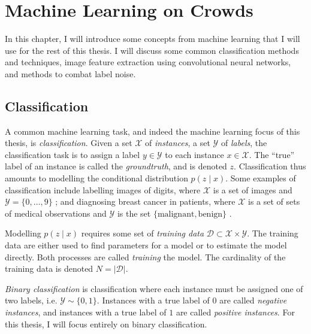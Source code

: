 \chapter{Machine Learning on Crowds}
\label{cha:ml}

 In this chapter, I will introduce some
concepts from machine learning that I will use for the rest of this thesis. I
will discuss some common classification methods and techniques, image feature
extraction using convolutional neural networks, and methods to combat label noise.

\section{Classification}
\label{sec:classification}
    
    A common machine learning task, and indeed the machine learning focus of
    this thesis, is \emph{classification}. Given a set $\mathcal X$ of
    \emph{instances}, a set $\mathcal Y$ of \emph{labels}, the classification
    task is to assign a label $y \in \mathcal Y$ to each instance $x \in
    \mathcal X$. The ``true'' label of an instance is called the
    \emph{groundtruth}, and is denoted $z$. Classification thus amounts to
    modelling the conditional distribution $p(z \mid x)$. Some examples of
    classification include labelling images of digits, where $\mathcal X$ is a
    set of images and $\mathcal Y = \{0, \dots, 9\}$ \citep{lecun98}; and
    diagnosing breast cancer in patients, where $\mathcal X$ is a set of sets
    of medical observations and $\mathcal Y$ is the set $\{\text{malignant},
    \text{benign}\}$ \citep{wolberg90}.

    Modelling $p(z \mid x)$ requires some set of \emph{training data} $\mathcal
    D \subset \mathcal X \times \mathcal Y$. The training data are either used
    to find parameters for a model or to estimate the model directly. Both
    processes are called \emph{training} the model. The cardinality of the
    training data is denoted $N = |\mathcal D|$.

    \emph{Binary classification} is classification where each instance must be
    assigned one of two labels, i.e. $\mathcal Y \sim \{0, 1\}$. Instances with
    a true label of $0$ are called \emph{negative instances}, and instances
    with a true label of $1$ are called \emph{positive instances}. For this
    thesis, I will focus entirely on binary classification.

